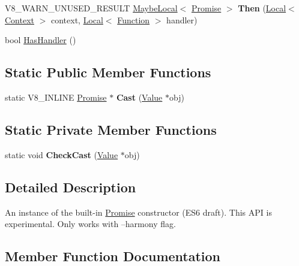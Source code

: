 \begin{DoxyCompactItemize}
\item 
V8\+\_\+\+W\+A\+R\+N\+\_\+\+U\+N\+U\+S\+E\+D\+\_\+\+R\+E\+S\+U\+LT \hyperlink{classv8_1_1_maybe_local}{Maybe\+Local}$<$ \hyperlink{classv8_1_1_promise}{Promise} $>$ {\bfseries Then} (\hyperlink{classv8_1_1_local}{Local}$<$ \hyperlink{classv8_1_1_context}{Context} $>$ context, \hyperlink{classv8_1_1_local}{Local}$<$ \hyperlink{classv8_1_1_function}{Function} $>$ handler)\hypertarget{classv8_1_1_promise_a07ef01c0576f8742117c84880f814c6f}{}\label{classv8_1_1_promise_a07ef01c0576f8742117c84880f814c6f}

\item 
bool \hyperlink{classv8_1_1_promise_aeea8bdfdbe2291632d7f0d45394c1722}{Has\+Handler} ()
\end{DoxyCompactItemize}
\subsection*{Static Public Member Functions}
\begin{DoxyCompactItemize}
\item 
static V8\+\_\+\+I\+N\+L\+I\+NE \hyperlink{classv8_1_1_promise}{Promise} $\ast$ {\bfseries Cast} (\hyperlink{classv8_1_1_value}{Value} $\ast$obj)\hypertarget{classv8_1_1_promise_adfa3b953beb2678dd3b5d6ddb3f0746d}{}\label{classv8_1_1_promise_adfa3b953beb2678dd3b5d6ddb3f0746d}

\end{DoxyCompactItemize}
\subsection*{Static Private Member Functions}
\begin{DoxyCompactItemize}
\item 
static void {\bfseries Check\+Cast} (\hyperlink{classv8_1_1_value}{Value} $\ast$obj)\hypertarget{classv8_1_1_promise_adb6df13db66c17070bb347e83658cafb}{}\label{classv8_1_1_promise_adb6df13db66c17070bb347e83658cafb}

\end{DoxyCompactItemize}


\subsection{Detailed Description}
An instance of the built-\/in \hyperlink{classv8_1_1_promise}{Promise} constructor (E\+S6 draft). This A\+PI is experimental. Only works with --harmony flag. 

\subsection{Member Function Documentation}
